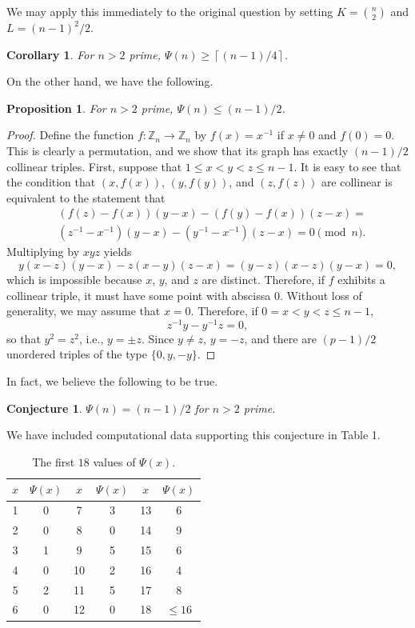 \documentclass[12pt]{article}
\newtheorem{prop}[theorem]{Proposition}
\newtheorem{cor}[theorem]{Corollary}
\newtheorem{conjecture}[principle]{Conjecture}
\newcommand{\ceil}[1]{\ensuremath{\left \lceil {#1} \right \rceil}}
\newcommand{\Z}{{\mathbb Z}}
\begin{document}
We may apply this immediately to the original question by setting $K = \binom{n}{2}$ and $L = (n-1)^2/2$.

\begin{cor} For $n>2$ prime, $\Psi(n) \geq \ceil{(n-1)/4}$.
\end{cor}

\noindent On the other hand, we have the following.

\begin{prop} \label{upperbound} For $n>2$ prime, $\Psi(n) \leq (n-1)/2$.
\end{prop}
\begin{proof} Define the function $f:\Z_n \rightarrow \Z_n$ by $f(x)=x^{-1}$ if $x \neq 0$ and $f(0)=0$.  This is clearly a permutation, and we show that its graph has exactly $(n-1)/2$ collinear triples.  First, suppose that $1 \leq x < y < z \leq n-1$.  It is easy to see that the condition that $(x,f(x))$, $(y,f(y))$, and $(z,f(z))$ are collinear is equivalent to the statement that
\begin{align*}
&(f(z)-f(x))(y-x)-(f(y)-f(x))(z-x) = \\
&(z^{-1}-x^{-1})(y-x)-(y^{-1}-x^{-1})(z-x) = 0 \pmod{n}.
\end{align*}
Multiplying by $xyz$ yields
$$
y(x-z)(y-x)-z(x-y)(z-x) = (y-z)(x-z)(y-x) = 0,
$$
which is impossible because $x$, $y$, and $z$ are distinct.  Therefore, if $f$ exhibits a collinear triple, it must have some point with abscissa $0$.  Without loss of generality, we may assume that $x=0$.  Therefore, if $0=x<y<z\leq n-1$,
$$
z^{-1}y-y^{-1}z = 0,
$$
so that $y^2 = z^2$, i.e., $y = \pm z$.  Since $y \neq z$, $y=-z$, and there are $(p-1)/2$ unordered triples of the type $\{0,y,-y\}$.
\end{proof}

In fact, we believe the following to be true.

\begin{conjecture} $\Psi(n) = (n-1)/2$ for $n>2$ prime.
\end{conjecture}

We have included computational data supporting this conjecture in Table 1.

\begin{table}[!ht]
\begin{center}
\begin{tabular}{|c|c||c|c||c|c|} \hline
$x$ & $\Psi(x)$ & $x$ & $\Psi(x)$ & $x$ & $\Psi(x)$ \\
\hline \hline 1  & 0 & 7 & 3 & 13 & 6 \\
\hline 2         & 0 & 8 & 0 & 14 & 9 \\
\hline 3         & 1 & 9 & 5 & 15 & 6 \\
\hline 4         & 0 & 10 & 2 & 16 & 4 \\
\hline 5         & 2 & 11 & 5 & 17 & 8 \\
\hline 6         & 0 & 12 & 0 & 18 & $\leq 16$ \\
\hline
\end{tabular}
\caption{The first $18$ values of $\Psi(x)$.}
\end{center}
\end{table}
\end{document}

